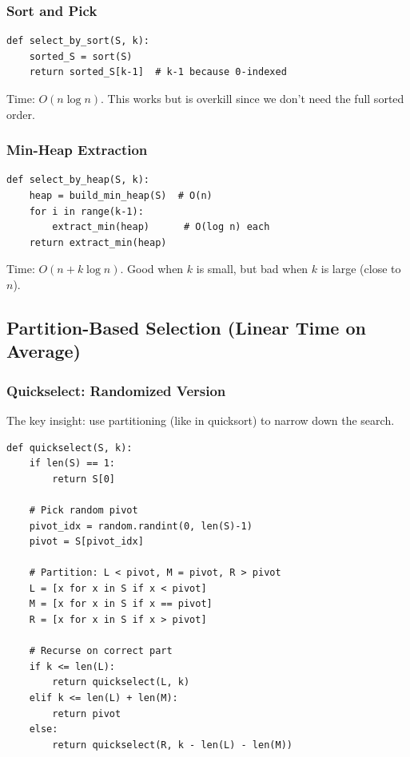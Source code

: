 \documentclass[11pt]{article}
\begin{document}
{{\subsubsection*{Sort and Pick}
\begin{lstlisting}
def select_by_sort(S, k):
    sorted_S = sort(S)
    return sorted_S[k-1]  # k-1 because 0-indexed
\end{lstlisting}

Time: $O(n \log n)$. This works but is overkill since we don't need the full sorted order.

\subsubsection*{Min-Heap Extraction}
\begin{lstlisting}
def select_by_heap(S, k):
    heap = build_min_heap(S)  # O(n)
    for i in range(k-1):
        extract_min(heap)      # O(log n) each
    return extract_min(heap)
\end{lstlisting}

Time: $O(n + k \log n)$. Good when $k$ is small, but bad when $k$ is large (close to $n$).

\subsection*{Partition-Based Selection (Linear Time on Average)}

\subsubsection*{Quickselect: Randomized Version}
The key insight: use partitioning (like in quicksort) to narrow down the search.

\begin{lstlisting}
def quickselect(S, k):
    if len(S) == 1:
        return S[0]
    
    # Pick random pivot
    pivot_idx = random.randint(0, len(S)-1)
    pivot = S[pivot_idx]
    
    # Partition: L < pivot, M = pivot, R > pivot
    L = [x for x in S if x < pivot]
    M = [x for x in S if x == pivot]
    R = [x for x in S if x > pivot]
    
    # Recurse on correct part
    if k <= len(L):
        return quickselect(L, k)
    elif k <= len(L) + len(M):
        return pivot
    else:
        return quickselect(R, k - len(L) - len(M))
\end{lstlisting}

}}
\end{document}

